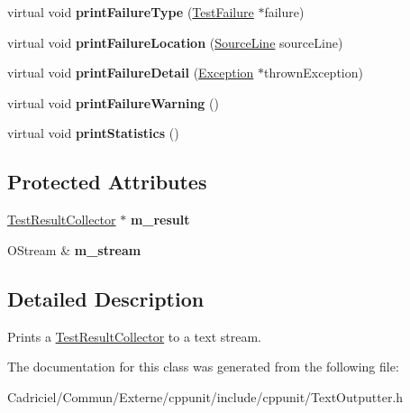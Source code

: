 \begin{DoxyCompactItemize}
\item 
virtual void {\bfseries print\+Failure\+Type} (\hyperlink{class_test_failure}{Test\+Failure} $\ast$failure)\hypertarget{class_text_outputter_a95c601c6a903700450d95e13db502247}{}\label{class_text_outputter_a95c601c6a903700450d95e13db502247}

\item 
virtual void {\bfseries print\+Failure\+Location} (\hyperlink{class_source_line}{Source\+Line} source\+Line)\hypertarget{class_text_outputter_a5ba7ad1968b180ce9593373718632af9}{}\label{class_text_outputter_a5ba7ad1968b180ce9593373718632af9}

\item 
virtual void {\bfseries print\+Failure\+Detail} (\hyperlink{class_exception}{Exception} $\ast$thrown\+Exception)\hypertarget{class_text_outputter_ae1a2ad2deebf4b12f803c59d867980f7}{}\label{class_text_outputter_ae1a2ad2deebf4b12f803c59d867980f7}

\item 
virtual void {\bfseries print\+Failure\+Warning} ()\hypertarget{class_text_outputter_a254f58361b8f5c59b60df1c007d9a438}{}\label{class_text_outputter_a254f58361b8f5c59b60df1c007d9a438}

\item 
virtual void {\bfseries print\+Statistics} ()\hypertarget{class_text_outputter_aeabfe5420c137b0a935c5b0acb45a6d8}{}\label{class_text_outputter_aeabfe5420c137b0a935c5b0acb45a6d8}

\end{DoxyCompactItemize}
\subsection*{Protected Attributes}
\begin{DoxyCompactItemize}
\item 
\hyperlink{class_test_result_collector}{Test\+Result\+Collector} $\ast$ {\bfseries m\+\_\+result}\hypertarget{class_text_outputter_a465e8c580e6f2db9ed021e1c44b95eb2}{}\label{class_text_outputter_a465e8c580e6f2db9ed021e1c44b95eb2}

\item 
O\+Stream \& {\bfseries m\+\_\+stream}\hypertarget{class_text_outputter_a947e16694e57297974e0f651d6298b80}{}\label{class_text_outputter_a947e16694e57297974e0f651d6298b80}

\end{DoxyCompactItemize}


\subsection{Detailed Description}
Prints a \hyperlink{class_test_result_collector}{Test\+Result\+Collector} to a text stream. 

The documentation for this class was generated from the following file\+:\begin{DoxyCompactItemize}
\item 
Cadriciel/\+Commun/\+Externe/cppunit/include/cppunit/Text\+Outputter.\+h\end{DoxyCompactItemize}
